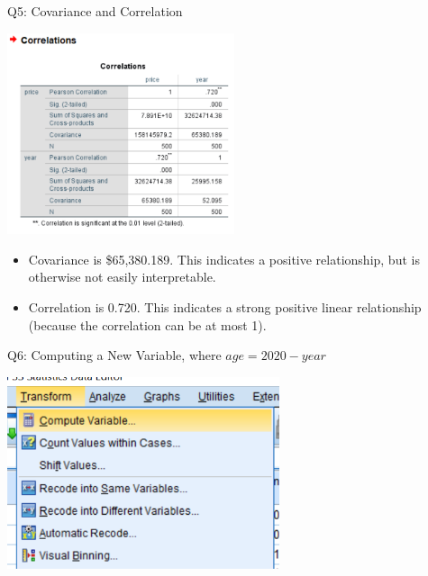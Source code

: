 \documentclass[11pt]{beamer}
\begin{document}
\begin{frame}{Q5: Covariance and Correlation}
  \begin{center}
    \includegraphics[width=0.5\textwidth]{f150-correlation-table-price-year.png}
  \end{center}
  \begin{itemize}
    \item Covariance is \$65,380.189. This indicates a positive relationship, but is otherwise not easily interpretable.
    \item Correlation is 0.720. This indicates a strong positive linear relationship (because the correlation can be at most 1).
  \end{itemize}
\end{frame}

\begin{frame}{Q6: Computing a New Variable, where $age=2020-year$}
  \begin{center}
    \includegraphics[width=0.6\textwidth]{f150-transform-compute-variable.png}
  \end{center}
\end{frame}
\end{document}
